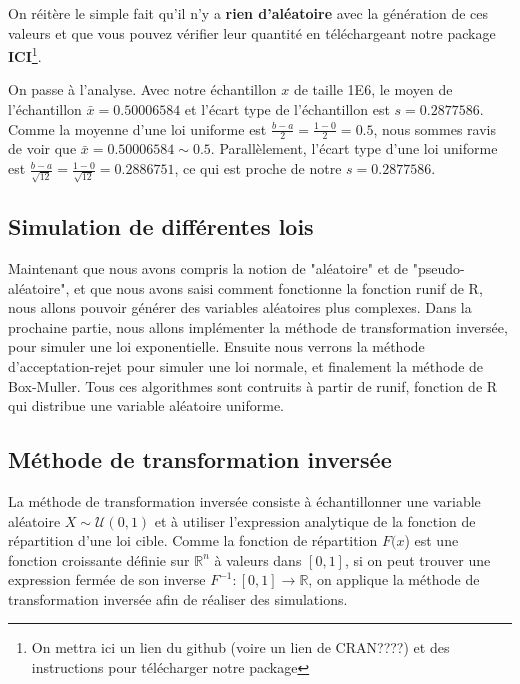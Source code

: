 \documentclass[10pt]{article} %
\begin{document}
On réitère le simple fait qu'il n'y a \textbf{rien d'aléatoire} avec la génération de ces valeurs et que vous pouvez vérifier leur quantité en
téléchargeant notre package \textbf{ICI}\footnote{On mettra ici un lien du github (voire un lien de CRAN????) et des instructions pour télécharger notre package}.

On passe à l'analyse. Avec notre échantillon $x$ de taille 1E6, le moyen de l'échantillon $\bar x = 0.50006584$ et l'écart type de l'échantillon est $s = 0.2877586$.
Comme la moyenne d'une loi uniforme est $\frac{b - a}{2} = \frac{1 - 0}{2} = 0.5$, nous sommes ravis de voir que $\bar x = 0.50006584 \sim 0.5$. Parallèlement, l'écart type
d'une loi uniforme est $\frac{b - a}{\sqrt{12}} = \frac{1 - 0}{\sqrt{12}} = 0.2886751$, ce qui est proche de notre $s = 0.2877586$.


\subsection{Simulation de différentes lois}


Maintenant que nous avons compris la notion de "aléatoire" et de "pseudo-aléatoire", et que nous avons saisi comment fonctionne la fonction runif de R, nous allons pouvoir générer des variables aléatoires plus complexes. Dans la prochaine partie, nous allons implémenter la méthode de transformation inversée, pour simuler une loi exponentielle. Ensuite nous verrons la méthode d'acceptation-rejet pour simuler une loi normale, et finalement la méthode de Box-Muller. Tous ces  algorithmes sont contruits à partir de runif, fonction de R qui distribue une variable aléatoire uniforme.

\subsection{Méthode de transformation inversée}

La méthode de transformation inversée consiste à échantillonner une variable aléatoire $X \sim \mathcal{U}(0, 1)$ et à utiliser l'expression analytique
de la fonction de répartition d'une loi cible. Comme la fonction de répartition $F(x$) est une fonction croissante définie sur $\mathbb{R}^n$ à valeurs dans
$[0, 1]$, si on peut trouver une expression fermée de son inverse $F^{-1} : [0, 1] \longrightarrow \mathbb{R}$, on applique la méthode de transformation inversée
afin de réaliser des simulations.
\end{document}
